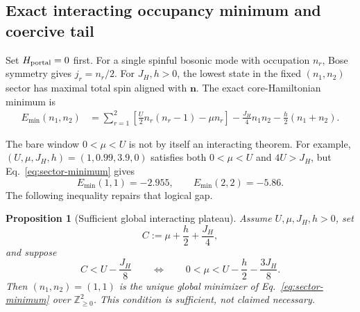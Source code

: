 \documentclass[11pt]{article}
\newtheorem{proposition}[theorem]{Proposition}
\theoremstyle{definition}
\theoremstyle{remark}
\begin{document}
\subsection{Exact interacting occupancy minimum and coercive tail}

Set \(H_{\rm portal}=0\) first.  For a single spinful bosonic mode with
occupation \(n_r\), Bose symmetry gives \(j_r=n_r/2\).  For \(J_H,h>0\), the
lowest state in the fixed \((n_1,n_2)\) sector has maximal total spin aligned
with \(\bm n\).  The exact core-Hamiltonian minimum is
\begin{align}
 E_{\min}(n_1,n_2)
 &=\sum_{r=1}^2\left[\frac U2n_r(n_r-1)-\mu n_r\right]
 -\frac{J_H}{4}n_1n_2-\frac h2(n_1+n_2).
 \label{eq:sector-minimum}
\end{align}

The bare window \(0<\mu<U\) is not by itself an interacting theorem.  For
example, \((U,\mu,J_H,h)=(1,0.99,3.9,0)\) satisfies both \(0<\mu<U\) and
\(4U>J_H\), but Eq.~\eqref{eq:sector-minimum} gives
\[
 E_{\min}(1,1)=-2.955,
 \qquad E_{\min}(2,2)=-5.86.
\]
The following inequality repairs that logical gap.

\begin{proposition}[Sufficient global interacting plateau]
Assume \(U,\mu,J_H,h>0\), set
\begin{equation}
 C:=\mu+\frac h2+\frac{J_H}{4},
 \label{eq:plateau-C}
\end{equation}
and suppose
\begin{equation}
 \boxed{C<U-\frac{J_H}{8}}
 \qquad\Longleftrightarrow\qquad
 \boxed{0<\mu<U-\frac h2-\frac{3J_H}{8}}.
 \label{eq:interacting-plateau-condition}
\end{equation}
Then \((n_1,n_2)=(1,1)\) is the unique global minimizer of
Eq.~\eqref{eq:sector-minimum} over \(\mathbb Z_{\ge0}^2\).  This condition is
sufficient, not claimed necessary.
\end{proposition}
\end{document}
